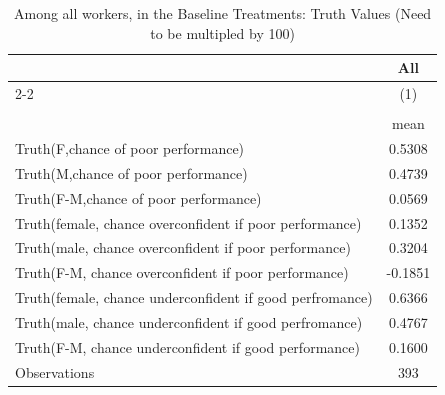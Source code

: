 \begin{table}[htbp]\centering
\def\sym#1{\ifmmode^{#1}\else\(^{#1}\)\fi}
\caption{Among all workers, in the Baseline Treatments: Truth Values (Need to be multipled by 100)}
\begin{tabular}{l*{1}{c}}
\hline\hline
                    &\multicolumn{1}{c}{All}\\\cmidrule(lr){2-2}
                    &\multicolumn{1}{c}{(1)}\\
                    &\multicolumn{1}{c}{}\\
                    &        mean\\
\hline
Truth(F,chance of poor performance)&      0.5308\\
Truth(M,chance of poor performance)&      0.4739\\
Truth(F-M,chance of poor performance)&      0.0569\\
Truth(female, chance overconfident if poor performance)&      0.1352\\
Truth(male, chance overconfident if poor performance)&      0.3204\\
Truth(F-M, chance overconfident if poor performance)&     -0.1851\\
Truth(female, chance underconfident if good perfromance)&      0.6366\\
Truth(male, chance underconfident if good perfromance)&      0.4767\\
Truth(F-M, chance underconfident if good performance)&      0.1600\\
\hline
Observations        &         393\\
\hline\hline
\end{tabular}
\end{table}
